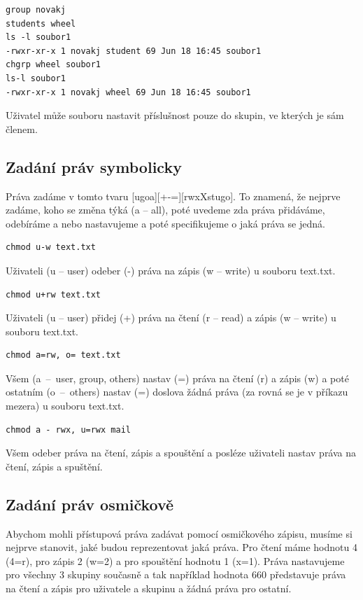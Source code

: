 \documentclass{article}
\begin{document}
\begin{verbatim}
group novakj
students wheel
ls -l soubor1
-rwxr-xr-x 1 novakj student 69 Jun 18 16:45 soubor1
chgrp wheel soubor1
ls-l soubor1
-rwxr-xr-x 1 novakj wheel 69 Jun 18 16:45 soubor1
\end{verbatim}
Uživatel může souboru nastavit příslušnost pouze do skupin, ve kterých je sám členem.

\subsection{Zadání práv symbolicky}
Práva zadáme v tomto tvaru [ugoa][+-=][rwxXstugo]. To znamená, že nejprve zadáme, koho se změna týká (a -- all), poté uvedeme zda práva přidáváme, odebíráme a nebo  nastavujeme a poté specifikujeme o jaká práva se jedná. 
\begin{verbatim}
chmod u-w text.txt
\end{verbatim}
Uživateli (u -- user) odeber (-) práva na zápis (w -- write) u souboru text.txt.

\begin{verbatim}
chmod u+rw text.txt
\end{verbatim}
Uživateli (u -- user) přidej (+) práva na čtení (r -- read) a zápis (w -- write) u souboru text.txt.

\begin{verbatim}
chmod a=rw, o= text.txt
\end{verbatim}
Všem (a~--~user, group, others) nastav (=) práva na čtení (r) a zápis (w) a poté ostatním (o~--~others) nastav (=) doslova žádná práva (za rovná se je v příkazu mezera) u souboru text.txt.

\begin{verbatim}
chmod a - rwx, u=rwx mail
\end{verbatim}
Všem odeber práva na čtení, zápis a spouštění a posléze uživateli nastav práva na čtení, zápis a spuštění.

\subsection{Zadání práv osmičkově}
Abychom mohli přístupová práva zadávat pomocí osmičkového zápisu, musíme si nejprve stanovit, jaké  budou reprezentovat jaká práva. Pro čtení máme hodnotu 4 (4=r), pro zápis 2 (w=2) a pro spouštění hodnotu 1 (x=1). Práva nastavujeme pro všechny 3 skupiny současně a tak například hodnota 660 představuje práva na čtení a zápis pro uživatele a skupinu a žádná práva pro ostatní.
\end{document}

